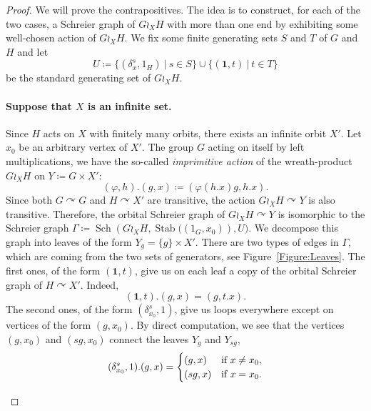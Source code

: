 \documentclass[a4paper]{article}
\theoremstyle{definition}
\theoremstyle{remark}
\DeclareMathOperator\Sch{Sch}
\DeclareMathOperator\stab{Stab}
\newcommand{\setst}[2]{\{#1\ |\ #2\}}
\begin{document}
\begin{proof}
We will prove the contrapositives. The idea is to construct, for each of the two cases, a Schreier graph of $G\wr_XH$ with more than one end by exhibiting some well-chosen action of $G\wr_XH$.
We fix some finite generating sets $S$ and $T$ of $G$ and $H$ and let
\[
	U\coloneqq\setst{(\delta_x^s,1_H)}{s \in S} \cup \setst{(\mathbf 1,t)}{t \in T}
\]
be the standard generating set of $G\wr_XH$.
%
%
%
\paragraph{Suppose that $X$ is an infinite set.}
Since $H$ acts on $X$ with finitely many orbits, there exists an infinite orbit $X'$.
Let $x_0$ be an arbitrary vertex of $X'$.
The group $G$ acting on itself by left multiplications, we have the so-called \emph{imprimitive action} of the wreath-product $G\wr_XH$ on $Y\coloneqq G\times X'$:
\[
	(\varphi,h). (g,x) \coloneqq (\varphi(h.x)g, h.x).
\]
Since both $G\curvearrowright G$ and $H\curvearrowright X'$ are transitive, the action $G\wr_XH\curvearrowright Y$ is also transitive.
Therefore, the orbital Schreier graph of $G\wr_XH\curvearrowright Y$ is isomorphic to the Schreier graph $\Gamma\coloneqq\Sch\left(G\wr_XH, \stab((1_G,x_0)\right), U)$. We decompose this graph into leaves of the form $Y_g = \{ g \} \times X'$. There are two types of edges in $\Gamma$, which are coming from the two sets of generators, see Figure~\ref{Figure:Leaves}. The first ones, of the form $(\mathbf 1,t)$, give us on each leaf a copy of the orbital Schreier graph of $H \curvearrowright X'$. Indeed,
\[
	(\mathbf 1,t).(g,x) = (g, t.x).
\]
The second ones, of the form $(\delta_{x_0}^s,1)$, give us loops everywhere except on vertices of the form $(g,x_0)$. By direct computation, we see that the vertices $(g,x_0)$ and $(sg,x_0)$ connect the leaves $Y_g$ and $Y_{sg}$,
\[
	(\delta_{x_0}^s,1).(g,x) =
		\begin{cases}
		(g,x) & \textnormal{if }x \neq x_0, \\
		(sg, x) & \textnormal{if }x = x_0.
		\end{cases}
\]
%
%
\begin{figure}[htbp]\centering
{}

\end{figure}
\end{proof}
\end{document}
